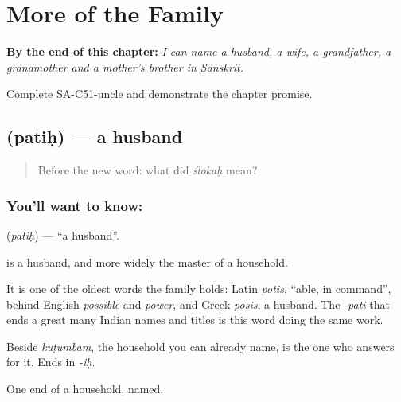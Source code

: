 
\chapter{More of the Family}
\label{ch:sa-family-more}

\begin{chapteropening}
\textbf{By the end of this chapter:} \emph{I can name a husband, a wife, a grandfather, a grandmother and a mother's brother in Sanskrit.}

Complete SA-C51-uncle and demonstrate the chapter promise.
\end{chapteropening}

\section[\texorpdfstring{\sk{पतिः} (patiḥ)}{पतिः (patiḥ)}]{ (patiḥ) — a husband}

\label{lesson:SA-C51-husband}



\begin{quote}
Before the new word: what did \emph{ślokaḥ} mean?
\end{quote}

\subsection*{You'll want to know: }
\textbf{} (\emph{patiḥ}) — \textquotedblleft{}a husband\textquotedblright{}.

\textbf{} is a husband, and more widely the master of a household.

It is one of the oldest words the family holds: Latin \emph{potis}, \textquotedblleft{}able, in command\textquotedblright{}, behind English \emph{possible} and \emph{power}, and Greek \emph{posis}, a husband. The \emph{-pati} that ends a great many Indian names and titles is this word doing the same work.

Beside \emph{kuṭumbam}, the household you can already name, \textbf{} is the one who answers for it. Ends in \emph{-iḥ}.

\begin{grammarlens}[title={What you've built}]
One end of a household, named.
\end{grammarlens}

